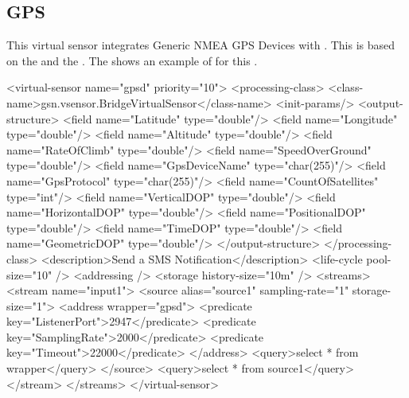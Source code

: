 \subsection{GPS \vs \label{quickref_tinyos_vs}}

This virtual sensor integrates Generic NMEA GPS Devices with \gsn.
This \vs is based on the  \vsp and the  \wrapper.
The  shows an example of \vsd for this \vs.

\begin{xmlcode}[caption={Sample of VSD using the Gpsd Wrapper}, label=listing:xml:gpsd_vsd]
<virtual-sensor name="gpsd" priority="10">
	<processing-class>
		<class-name>gsn.vsensor.BridgeVirtualSensor</class-name>
		<init-params/>
		<output-structure>
			<field name="Latitude" type="double"/>
			<field name="Longitude" type="double"/>
			<field name="Altitude" type="double"/>
			<field name="RateOfClimb" type="double"/>
			<field name="SpeedOverGround" type="double"/>
			<field name="GpsDeviceName" type="char(255)"/>
			<field name="GpsProtocol" type="char(255)"/>
			<field name="CountOfSatellites" type="int"/>
			<field name="VerticalDOP" type="double"/>
			<field name="HorizontalDOP" type="double"/>
			<field name="PositionalDOP" type="double"/>
			<field name="TimeDOP" type="double"/>
			<field name="GeometricDOP" type="double"/>
		</output-structure>
	</processing-class>
	<description>Send a SMS Notification</description>
	<life-cycle pool-size="10" />
	<addressing />
	<storage history-size="10m" />
	<streams>
		<stream name="input1">
			<source alias="source1" sampling-rate="1" storage-size="1">
				<address wrapper="gpsd">
					<predicate key="ListenerPort">2947</predicate>
					<predicate key="SamplingRate">2000</predicate>
					<predicate key="Timeout">22000</predicate>
				</address>
				<query>select * from wrapper</query>
			</source>
			<query>select * from source1</query>
		</stream> 
	</streams>
</virtual-sensor>
\end{xmlcode}